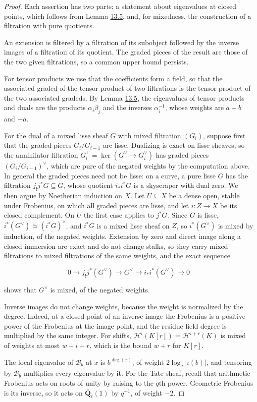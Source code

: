 \documentclass[11pt]{article}
\begin{document}
\begin{proof}[{Proof}]\label{bp25}%
Each assertion has two parts: a statement about eigenvalues at closed points, which follows from Lemma \hyperref[bp19]{13.5}, and, for mixedness, the construction of a filtration with pure quotients.

An extension is filtered by a filtration of its subobject followed by the inverse images of a filtration of its quotient. The graded pieces of the result are those of the two given filtrations, so a common upper bound persists.

For tensor products we use that the coefficients form a field, so that the associated graded of the tensor product of two filtrations is the tensor product of the two associated gradeds. By Lemma \hyperref[bp19]{13.5}, the eigenvalues of tensor products and duals are the products \(\alpha_i\beta_j\) and the inverses \(\alpha_i^{-1}\), whose weights are \(a+b\) and \(-a\).

For the dual of a mixed lisse sheaf \(G\) with mixed filtration \((G_i)\), suppose first that the graded pieces \(G_i/G_{i-1}\) are lisse. Dualizing is exact on lisse sheaves, so the annihilator filtration \(G_i^\perp=\ker(G^\vee\to G_i^\vee)\) has graded pieces \((G_i/G_{i-1})^\vee\), which are pure of the negated weights by the computation above. In general the graded pieces need not be lisse: on a curve, a pure lisse \(G\) has the filtration \(j_!j^*G\subseteq G\), whose quotient \(i_*i^*G\) is a skyscraper with dual zero. We then argue by Noetherian induction on \(X\). Let \(U\subseteq X\) be a dense open, stable under Frobenius, on which all graded pieces are lisse, and let \(i:Z\to X\) be its closed complement. On \(U\) the first case applies to \(j^*G\). Since \(G\) is lisse, \(i^*(G^\vee)\simeq(i^*G)^\vee\), and \(i^*G\) is a mixed lisse sheaf on \(Z\), so \(i^*(G^\vee)\) is mixed by induction, of the negated weights. Extension by zero and direct image along a closed immersion are exact and do not change stalks, so they carry mixed filtrations to mixed filtrations of the same weights, and the exact sequence

\[
0\to j_!j^*(G^\vee)\to G^\vee\to i_*i^*(G^\vee)\to 0
\]

shows that \(G^\vee\) is mixed, of the negated weights.

Inverse images do not change weights, because the weight is normalized by the degree. Indeed, at a closed point of an inverse image the Frobenius is a positive power of the Frobenius at the image point, and the residue field degree is multiplied by the same integer. For shifts, \(\mathcal H^i(K[r])=\mathcal H^{i+r}(K)\) is mixed of weights at most \(w+i+r\), which is the bound \(w+r\) for \(K[r]\).

The local eigenvalue of \(\mathcal B_b\) at \(x\) is \(b^{\deg(x)}\), of weight \(2\log_q|\iota(b)|\), and tensoring by \(\mathcal B_b\) multiplies every eigenvalue by it. For the Tate sheaf, recall that arithmetic Frobenius acts on roots of unity by raising to the \(q\)th power. Geometric Frobenius is its inverse, so it acts on \(\overline{\mathbf Q}_\ell(1)\) by \(q^{-1}\), of weight \(-2\).
\end{proof}
\end{document}
